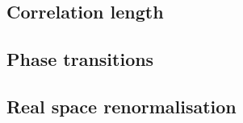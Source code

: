 \subsection{Correlation length}

\subsection{Phase transitions}

\subsection{Real space renormalisation}




\begin{figure}[h]

\centering%
\end{figure}




